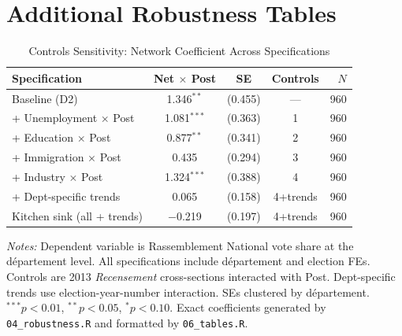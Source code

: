 \documentclass[12pt]{article}
\newcommand{\rn}{Rassemblement National}
\newcommand{\dept}{d\'{e}partement}
\begin{document}
\section{Additional Robustness Tables}
\label{app:robustness}

\begin{table}[H]
\centering
\caption{Controls Sensitivity: Network Coefficient Across Specifications}
\label{tab:controls}
\begin{threeparttable}
\begin{tabular}{@{}lcccr@{}}
\toprule
Specification & Net $\times$ Post & SE & Controls & $N$ \\
\midrule
Baseline (D2) & 1.346$^{**}$ & (0.455) & --- & 960 \\
+ Unemployment $\times$ Post & 1.081$^{***}$ & (0.363) & 1 & 960 \\
+ Education $\times$ Post & 0.877$^{**}$ & (0.341) & 2 & 960 \\
+ Immigration $\times$ Post & 0.435 & (0.294) & 3 & 960 \\
+ Industry $\times$ Post & 1.324$^{***}$ & (0.388) & 4 & 960 \\
+ Dept-specific trends & 0.065 & (0.158) & 4+trends & 960 \\
Kitchen sink (all + trends) & $-$0.219 & (0.197) & 4+trends & 960 \\
\bottomrule
\end{tabular}
\begin{tablenotes}
\small
\item \textit{Notes:} Dependent variable is \rn{} vote share at the \dept{} level. All specifications include \dept{} and election FEs. Controls are 2013 \textit{Recensement} cross-sections interacted with Post. Dept-specific trends use election-year-number interaction. SEs clustered by \dept{}. $^{***}p<0.01$, $^{**}p<0.05$, $^{*}p<0.10$. Exact coefficients generated by \texttt{04\_robustness.R} and formatted by \texttt{06\_tables.R}.
\end{tablenotes}
\end{threeparttable}
\end{table}
\end{document}
